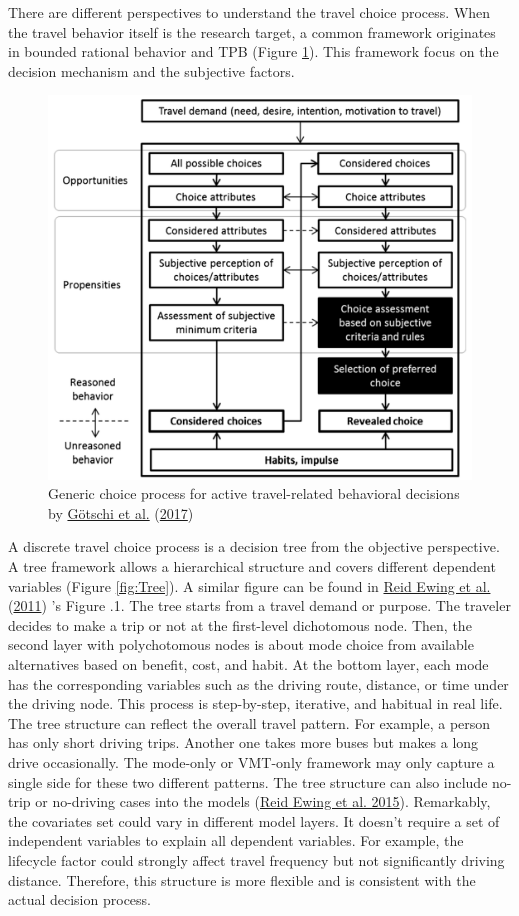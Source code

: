 \documentclass[
  12pt,
]{article}
\begin{document}
There are different perspectives to understand the travel choice process. When the travel behavior itself is the research target, a common framework originates in bounded rational behavior and TPB (Figure \ref{fig:choiceprocess}). This framework focus on the decision mechanism and the subjective factors.



\begin{figure}

{\centering \includegraphics[width=0.5\linewidth]{fig/gotschiComprehensiveConceptualFramework2017} 

}

\caption{ Generic choice process for active travel-related behavioral decisions by \protect\hyperlink{ref-gotschiComprehensiveConceptualFramework2017}{Götschi et al.} (\protect\hyperlink{ref-gotschiComprehensiveConceptualFramework2017}{2017}) }\label{fig:choiceprocess}
\end{figure}

A discrete travel choice process is a decision tree from the objective perspective. A tree framework allows a hierarchical structure and covers different dependent variables (Figure \ref{fig:Tree}). A similar figure can be found in \protect\hyperlink{ref-ewingTrafficGeneratedMixedUse2011}{Reid Ewing et al.} (\protect\hyperlink{ref-ewingTrafficGeneratedMixedUse2011}{2011}) 's Figure .1. The tree starts from a travel demand or purpose. The traveler decides to make a trip or not at the first-level dichotomous node. Then, the second layer with polychotomous nodes is about mode choice from available alternatives based on benefit, cost, and habit. At the bottom layer, each mode has the corresponding variables such as the driving route, distance, or time under the driving node. This process is step-by-step, iterative, and habitual in real life. The tree structure can reflect the overall travel pattern. For example, a person has only short driving trips. Another one takes more buses but makes a long drive occasionally. The mode-only or VMT-only framework may only capture a single side for these two different patterns. The tree structure can also include no-trip or no-driving cases into the models (\protect\hyperlink{ref-ewingVaryingInfluencesBuilt2015}{Reid Ewing et al. 2015}). Remarkably, the covariates set could vary in different model layers. It doesn't require a set of independent variables to explain all dependent variables. For example, the lifecycle factor could strongly affect travel frequency but not significantly driving distance. Therefore, this structure is more flexible and is consistent with the actual decision process.
\end{document}
